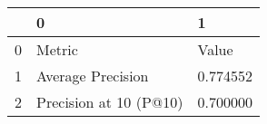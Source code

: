 \begin{tabular}{lll}
\toprule
 & 0 & 1 \\
\midrule
0 & Metric & Value \\
1 & Average Precision & 0.774552 \\
2 & Precision at 10 (P@10) & 0.700000 \\
\bottomrule
\end{tabular}

